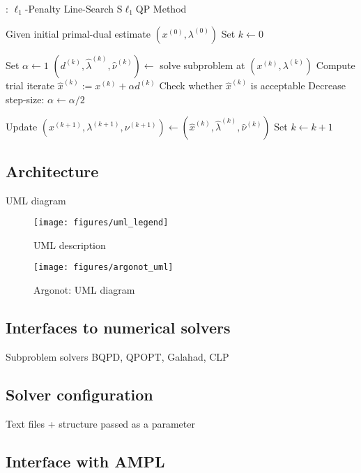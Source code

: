 \medskip
\begin{algorithm}[H]
\caption{\solvername{}: $\ell_1$-Penalty Line-Search S$\ell_1$QP Method}
Given initial primal-dual estimate $(x^{(0)}, \lambda^{(0)})$ \;
Set $k \gets 0$ \;
 {
	\colorbox[gray]{0.95}{
	\begin{minipage}{0.88\textwidth}
	Set $\alpha \gets 1$ \;
	\globalizationstrategy $(d^{(k)}, \hat{\lambda}^{(k)}, \hat{\nu}^{(k)}) \gets$ solve subproblem at $(x^{(k)}, \lambda^{(k)})$ \;
	 {
		Compute trial iterate $\hat{x}^{(k)} := x^{(k)} + \alpha d^{(k)}$ \;
		\globalizationstrategy Check whether $\hat{x}^{(k)}$ is acceptable \;
		 {
			Decrease step-size: $\alpha \gets \alpha/2$ \;
		}
	}
	\end{minipage}} \;
	Update $(x^{(k+1)}, \lambda^{(k+1)}, \nu^{(k+1)}) \gets (\hat{x}^{(k)}, \hat{\lambda}^{(k)}, \hat{\nu}^{(k)})$ \;
	Set $k \gets k+1$ \;
}
\end{algorithm}
\medskip

\clearpage

\subsection{Architecture}

UML diagram

\begin{figure}[h!]
	\centering
	\texttt{[image: figures/uml\_legend]}
	\caption{UML description}
\end{figure}

\begin{figure}[h!]
	\centering
	\texttt{[image: figures/argonot\_uml]}
	\caption{Argonot: UML diagram}
\end{figure}

\subsection{Interfaces to numerical solvers}

Subproblem solvers
BQPD, QPOPT, Galahad, CLP

\subsection{Solver configuration}

Text files + structure passed as a parameter

\subsection{Interface with AMPL}

\cite{Gay1997Hooking}


